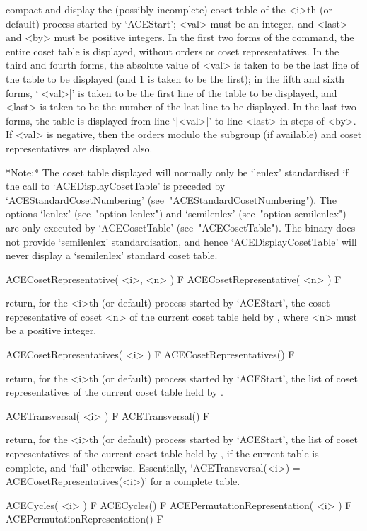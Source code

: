 compact and display the (possibly incomplete) coset table of the <i>th
(or default) process started by `ACEStart'; <val> must be an  integer,
and <last> and <by> must be positive integers. In the first two  forms
of the command, the entire coset table is displayed, without orders or
coset representatives. In the third and  fourth  forms,  the  absolute
value of <val> is taken to be  the  last  line  of  the  table  to  be
displayed (and 1 is taken to be the first); in  the  fifth  and  sixth
forms, `|<val>|' is taken to be the first line  of  the  table  to  be
displayed, and <last> is taken to be the number of the last line to be
displayed. In the last two forms, the table  is  displayed  from  line
`|<val>|' to line <last> in steps of <by>. If <val> is negative,  then
the  orders   modulo   the   subgroup   (if   available)   and   coset
representatives are displayed also.

*Note:*
The coset table displayed will normally only be `lenlex'  standardised
if   the   call   to    `ACEDisplayCosetTable'    is    preceded    by
`ACEStandardCosetNumbering'   (see~"ACEStandardCosetNumbering").   The
options `lenlex' (see~"option lenlex") and  `semilenlex'  (see~"option
semilenlex")     are     only     executed     by      `ACECosetTable'
(see~"ACECosetTable"). The {\ACE} binary does not provide `semilenlex'
standardisation, and hence `ACEDisplayCosetTable' will never display a
`semilenlex' standard coset table.

\>ACECosetRepresentative( <i>, <n> ) F
\>ACECosetRepresentative( <n> ) F

return, for the <i>th (or default) process started by `ACEStart',  the
coset representative of coset <n> of the current coset table  held  by
{\ACE}, where <n> must be a positive integer.

\>ACECosetRepresentatives( <i> ) F
\>ACECosetRepresentatives() F

return, for the <i>th (or default) process started by `ACEStart',  the
list of coset representatives of  the  current  coset  table  held  by
{\ACE}.

\>ACETransversal( <i> ) F
\>ACETransversal() F

return, for the <i>th (or default) process started by `ACEStart',  the
list of coset representatives of  the  current  coset  table  held  by
{\ACE}, if the  current  table  is  complete,  and  `fail'  otherwise.
Essentially, `ACETransversal(<i>) = ACECosetRepresentatives(<i>)'  for
a complete table.

\>ACECycles( <i> ) F
\>ACECycles() F
\>ACEPermutationRepresentation( <i> ) F
\>ACEPermutationRepresentation() F


